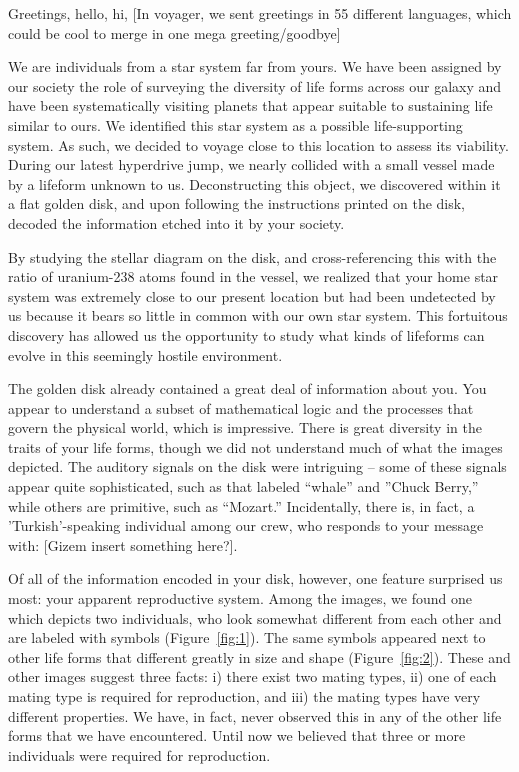
Greetings, hello, hi, [In voyager, we sent greetings in 55 different languages, which could be cool to merge in one mega greeting/goodbye]

We are individuals from a star system far from yours. 
We have been assigned by our society the role of surveying the diversity of life forms across our galaxy and have been systematically visiting planets that appear suitable to sustaining life similar to ours. We identified this star system as a possible life-supporting system. As such, we decided to voyage close to this location to assess its viability.
During our latest hyperdrive jump, we nearly collided with a small vessel made by a lifeform unknown to us. Deconstructing this object, we discovered within it a flat golden disk, and upon following the instructions printed on the disk, decoded the information etched into it by your society. 

By studying the stellar diagram on the disk, and cross-referencing this with the ratio of uranium-238 atoms found in the vessel, we realized that your home star system was extremely close to our present location but had been undetected by us because it bears so little in common with our own star system. This fortuitous discovery has allowed us the opportunity to study what kinds of lifeforms can evolve in this seemingly hostile environment. 

The golden disk already contained a great deal of information about you. You appear to understand a subset of mathematical logic and the processes that govern the physical world, which is impressive. There is great diversity in the traits of your life forms, though we did not understand much of what the images depicted. The auditory signals on the disk were intriguing -- some of these signals appear quite sophisticated, such as that labeled ``whale'' and ''Chuck Berry,'' while others are primitive, such as ``Mozart.'' Incidentally, there is, in fact, a 'Turkish'-speaking individual among our crew, who responds to your message with: [Gizem insert something here?]. 

Of all of the information encoded in your disk, however, one feature surprised us most: your apparent reproductive system. Among the images, we found one which depicts two individuals, who look somewhat different from each other and are labeled with symbols (Figure~\ref{fig:1}). The same symbols appeared next to other life forms that different greatly in size and shape (Figure~\ref{fig:2}). These and other images suggest three facts: i) there exist two mating types, ii) one of each mating type is required for reproduction, and iii) the mating types have very different properties. We have, in fact, never observed this in any of the other life forms that we have encountered. Until now we believed that three or more individuals were required for reproduction.

